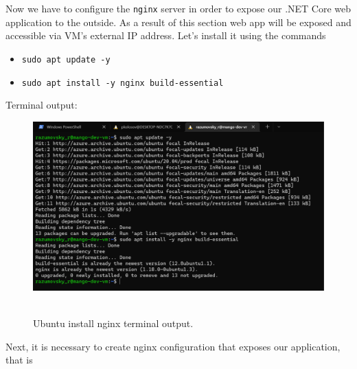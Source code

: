 Now we have to configure the \texttt{nginx} server in order to expose our .NET Core web application to the outside.
As a result of this section web app will be exposed and accessible via VM's external IP address.
Let's install it using the commands
\begin{itemize}
    \item \texttt{sudo apt update -y}
    \item \texttt{sudo apt install -y nginx build-essential}
\end{itemize}
Terminal output:
\begin{figure}[H]
    \centering
    \includegraphics[width=1\textwidth]{img/06_install_nginx}
    ~\caption{Ubuntu install nginx terminal output.}\label{fig:figure15}
\end{figure}
Next, it is necessary to create nginx configuration that exposes our application, that is
